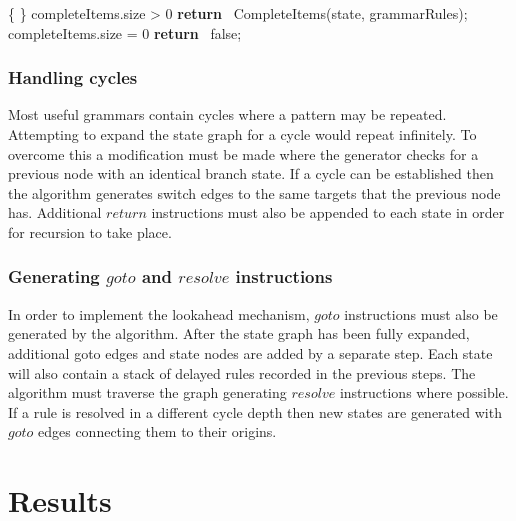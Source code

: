 \documentclass[a4paper,11pt]{article}
\begin{document}
\begin{center}
\begin{gcl}
  \{  \}
  \IF completeItems.size > 0 \rightarrow
    \textbf{return} \ CompleteItems(state, grammarRules);
  \BAR completeItems.size = 0 \rightarrow
    \textbf{return} \ false;
  \FI
\CORP

\end{gcl}
\end{center}

\subsubsection{Handling cycles}
Most useful grammars contain cycles where a pattern may be repeated. Attempting to expand the state graph for a cycle would repeat infinitely.
To overcome this a modification must be made where the generator checks for a previous node with an identical branch state. 
If a cycle can be established then the algorithm generates switch edges to the same targets that the previous node has. 
Additional $return$ instructions must also be appended to each state in order for recursion to take place.

\subsubsection{Generating $goto$ and $resolve$ instructions}
In order to implement the lookahead mechanism, $goto$ instructions must also be generated by the algorithm.
After the state graph has been fully expanded, additional goto edges and state nodes are added by a separate step.
Each state will also contain a stack of delayed rules recorded in the previous steps.
The algorithm must traverse the graph generating $resolve$ instructions where possible. 
If a rule is resolved in a different cycle depth then new states are generated with $goto$ edges connecting them to their origins.


\section{Results}
\end{document}
